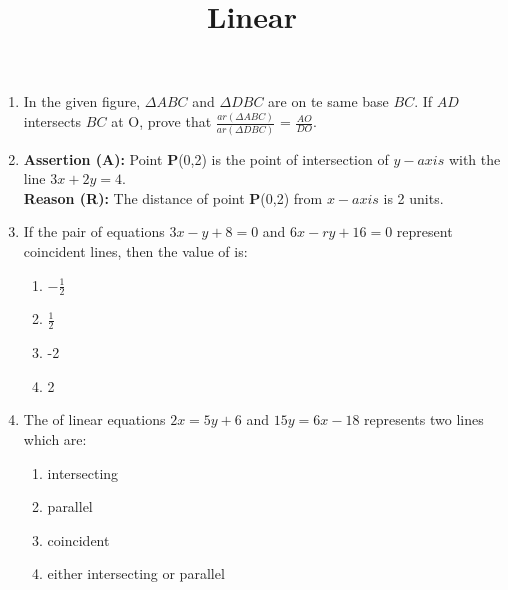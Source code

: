 \documentclass{article}
\let\vec\mathbf
\begin{document}
\begin{enumerate}
		\newpage

	\item In the given figure, $\Delta ABC$ and $\Delta DBC$ are on te same base $BC$. If $AD$ intersects $BC$ at O, prove that $\frac { ar(\Delta ABC)}{ar (\Delta DBC)}$ = $\frac{AO}{DO}$.

		\begin{center}
		\end{center}

\pagebreak

\title{\textbf{Linear}}
\date{}
\maketitle

	\item \textbf{Assertion (A):} Point $\vec{P}$(0,2) is the point of intersection of $y-axis$ with  the line $3x+2y=4$.\\
		\textbf{Reason (R):} The distance of point $\vec{P}$(0,2) from $x-axis$ is 2 units.


	\item If the pair of equations $3x-y+8=0$ and $6x-ry+16=0$ represent coincident lines, then the value of  is:

		\begin{enumerate}
			\item $-\frac{1}{2}$
			\item $\frac{1}{2}$
			\item -2
			\item 2
		\end{enumerate}

	\item The of linear equations $2x=5y+6$ and $15y=6x-18$ represents two lines which are:

			\begin{enumerate}
				\item intersecting
				\item parallel
				\item coincident
				\item either intersecting or parallel
			\end{enumerate}


\end{enumerate}
\end{document}
